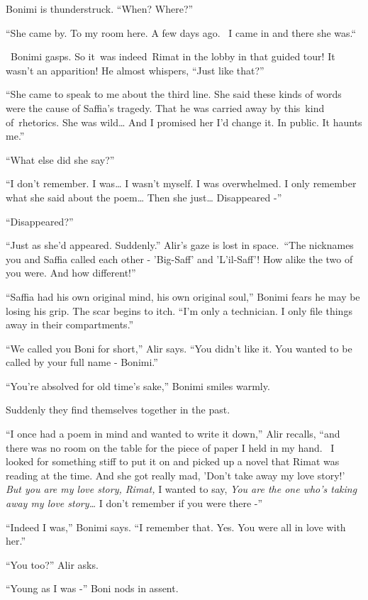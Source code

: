 \documentclass[twoside,11pt]{book}
\begin{document}
Bonimi is thunderstruck. ``When? Where?''

``She came by. To my room here. A few days ago. ~I came in and there she was.``\ 

~Bonimi gasps. So it\ was indeed~Rimat in the lobby in that guided tour! It wasn't an apparition! He almost whispers,
``Just like that?'' 

``She came to speak to me about the third line. She said these kinds of words were the cause of Saffia's
tragedy. That he was carried away by this~kind of{\ }rhetorics. She was wild{\dots} And I promised her
I'd change it. In public. It haunts me.'' 

``What else did she say?'' 

``I don't remember. I was{\dots} I wasn't myself. I was overwhelmed. I only remember what she said about
the poem{\dots} Then she just{\dots} Disappeared -'' 

``Disappeared?'' 

``Just as she'd appeared. Suddenly.'' Alir's gaze is lost in space.\ ``The
nicknames you and Saffia called each other - 'Big-Saff' and 'L'il-Saff'! How alike the two of you were. And how
different!'' 

``Saffia had his own original mind, his own original soul,'' Bonimi fears he may be losing his
grip. The scar begins to itch. ``I'm only a technician. I only file things away in their
compartments.''

``We called you Boni for short,'' Alir says. ``You didn't like it. You wanted to
be called by your full name - Bonimi.''

``You're absolved for old time's sake,'' Bonimi smiles warmly. 

Suddenly they find themselves together in the past. 

``I once had a poem in mind and wanted to write it down,'' Alir recalls, ``and
there was no room on the table for the piece of paper I held in my hand. ~I looked for something stiff to put it on and
picked up a novel that Rimat was reading at the time. And she got really mad, 'Don't take away my love story!'
\textit{But you are my love story, Rimat, }I wanted to say, \textit{You are the one who's taking away my love
story{\dots}} I don't remember if you were there -'' 

``Indeed I was,'' Bonimi says. ``I remember that. Yes. You were all in love with
her.'' 

``You too?'' Alir asks. 

``Young as I was -'' Boni nods in assent. 
\end{document}
